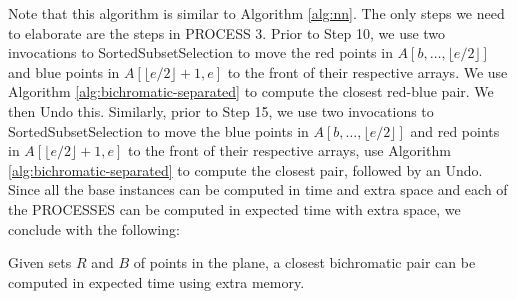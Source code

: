 Note that this algorithm is similar to Algorithm \ref{alg:nn}. The only steps
we need to elaborate are the steps in PROCESS 3. Prior to Step 10, we use two
invocations to SortedSubsetSelection to move the red points in
$A[b,\ldots,\lfloor e/2 \rfloor]$ and blue points in $A[\lfloor e/2 \rfloor +
1, e]$ to the front of their respective arrays. We use Algorithm
\ref{alg:bichromatic-separated} to compute the closest red-blue pair.  We then
Undo this. Similarly, prior to Step 15, we use two invocations to
SortedSubsetSelection to move the blue points in $A[b,\ldots,\lfloor e/2
\rfloor]$ and red points in $A[\lfloor e/2 \rfloor + 1, e]$ to the front of
their respective arrays, use Algorithm \ref{alg:bichromatic-separated} to
compute the closest pair, followed by an Undo.  Since all the base instances
can be computed in  time and  extra space and each of the
PROCESSES can be computed in  expected time with  extra space, we
conclude with the following:

\begin{theorem}
  Given sets $R$ and $B$ of  points in the plane, a closest
  bichromatic pair can be computed in  expected time
  using  extra memory.
\end{theorem}

